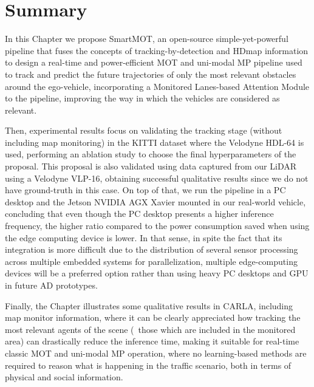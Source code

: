 \section{Summary}
\label{sec:4_summary}

In this Chapter we propose SmartMOT, an open-source simple-yet-powerful pipeline that fuses the concepts of tracking-by-detection and \ac{HDmap} information to design a real-time and power-efficient \ac{MOT} and uni-modal \ac{MP} pipeline used to track and predict the future trajectories of only the most relevant obstacles around the ego-vehicle, incorporating a Monitored Lanes-based Attention Module to the pipeline, improving the way in which the vehicles are considered as relevant.

Then, experimental results focus on validating the tracking stage (without including map monitoring) in the KITTI dataset where the Velodyne HDL-64 is used, performing an ablation study to choose the final hyperparameters of the proposal. This proposal is also validated using data captured from our \ac{LiDAR} using a Velodyne VLP-16, obtaining successful qualitative results since we do not have ground-truth in this case. On top of that, we run the pipeline in a PC desktop and the Jetson NVIDIA AGX Xavier mounted in our real-world vehicle, concluding that even though the PC desktop presents a higher inference frequency, the higher ratio compared to the power consumption saved when using the edge computing device is lower. In that sense, in spite the fact that its integration is more difficult due to the distribution of several sensor processing across multiple embedded systems for parallelization, multiple edge-computing devices will be a preferred option rather than using heavy PC desktops and \ac{GPU} in future \ac{AD} prototypes. 

Finally, the Chapter illustrates some qualitative results in \ac{CARLA}, including map monitor information, where it can be clearly appreciated how tracking the most relevant agents of the scene (\ie \ those which are included in the monitored area) can drastically reduce the inference time, making it suitable for real-time classic \ac{MOT} and uni-modal \ac{MP} operation, where no learning-based methods are required to reason what is happening in the traffic scenario, both in terms of physical and social information.

